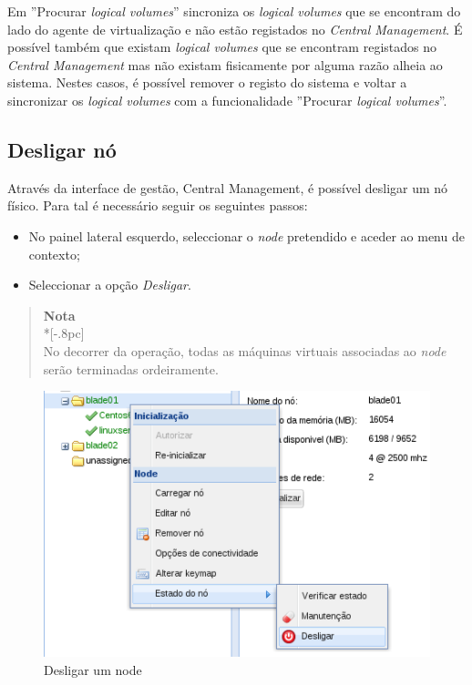 Em ''Procurar \emph{logical volumes}'' sincroniza os \emph{logical volumes} que se encontram do lado do agente de virtualização e não estão registados no \emph{Central Management}.
É possível também que existam \emph{logical volumes} que se encontram registados no \emph{Central Management} mas não existam fisicamente por alguma razão alheia ao sistema. 
Nestes casos, é possível remover o registo do sistema e voltar a sincronizar os \emph{logical volumes} com a funcionalidade ''Procurar \emph{logical volumes}''.

\subsection{Desligar nó}
\label{sub:desligar_no}
Através da interface de gestão, Central Management, é possível desligar um nó físico. Para tal é necessário seguir os seguintes passos:

\begin{itemize}
\item No painel lateral esquerdo, seleccionar o \textit{node} pretendido e aceder ao menu de contexto;
\item Seleccionar a opção \textit{Desligar}.
\end{itemize}

\begin{quote}
    {\large \bf Nota} \\*[-.8pc]
    \underline{\hspace{6in}} \\
    No decorrer da operação, todas as máquinas virtuais associadas ao \textit{node} serão terminadas ordeiramente.
\end{quote}


\begin{figure}[H]
        \begin{center}
        \includegraphics[scale=0.45]{screenshots/shutdownnode.png}
        \caption{Desligar um node}
        \label{fig:storage_lv_ctx}
        \end{center}
\end{figure}

